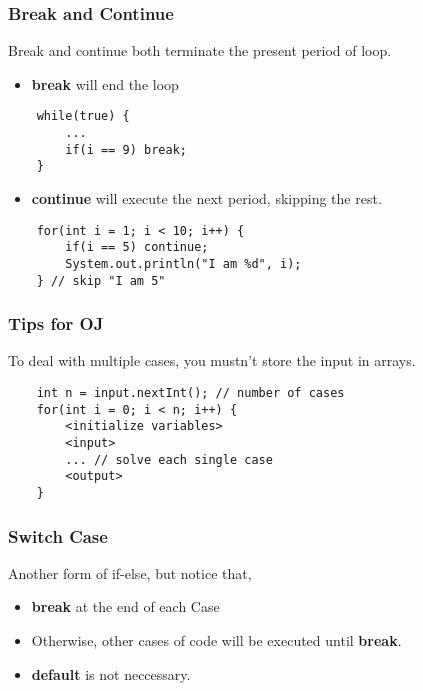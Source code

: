 \documentclass{beamer}
\begin{document}
\begin{frame}[fragile]
    \frametitle{Break and Continue}
    Break and continue both terminate the present period of loop.
\begin{itemize}
    \item \textbf{break} will end the loop
\end{itemize}
\begin{lstlisting}
    while(true) {
        ...
        if(i == 9) break;
    }
\end{lstlisting}
\begin{itemize}
    \item \textbf{continue} will execute the next period, skipping the rest.
\end{itemize}
\begin{lstlisting}
    for(int i = 1; i < 10; i++) {
        if(i == 5) continue;
        System.out.println("I am %d", i);
    } // skip "I am 5"
\end{lstlisting}
\end{frame}

\begin{frame}[fragile]
    \frametitle{Tips for OJ}
    To deal with multiple cases, you mustn't store the input in arrays.
\begin{lstlisting}
    int n = input.nextInt(); // number of cases
    for(int i = 0; i < n; i++) {
        <initialize variables>
        <input>
        ... // solve each single case
        <output>
    }
\end{lstlisting}
\end{frame}

\begin{frame}
    \frametitle{Switch Case}
    Another form of if-else, but notice that,
    \begin{itemize}
        \item \textbf{break} at the end of each Case
        \item Otherwise, other cases of code will be executed until \textbf{break}.
        \item \textbf{default} is not neccessary.
    \end{itemize}
\end{frame}
\end{document}
